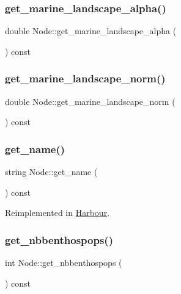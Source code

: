 \subsubsection{\texorpdfstring{get\_marine\_landscape\_alpha()}{get\_marine\_landscape\_alpha()}}
{\footnotesize\ttfamily double Node\+::get\+\_\+marine\+\_\+landscape\+\_\+alpha (\begin{DoxyParamCaption}{ }\end{DoxyParamCaption}) const}

\mbox{\label{class_node_a0011af7b829153b4e449067662b7e606}} 
\subsubsection{\texorpdfstring{get\_marine\_landscape\_norm()}{get\_marine\_landscape\_norm()}}
{\footnotesize\ttfamily double Node\+::get\+\_\+marine\+\_\+landscape\+\_\+norm (\begin{DoxyParamCaption}{ }\end{DoxyParamCaption}) const}

\mbox{\label{class_node_afd4050178cc0d4eb0ff137466dcafdd8}} 
\subsubsection{\texorpdfstring{get\_name()}{get\_name()}}
{\footnotesize\ttfamily string Node\+::get\+\_\+name (\begin{DoxyParamCaption}{ }\end{DoxyParamCaption}) const\hspace{0.3cm}{\ttfamily [virtual]}}



Reimplemented in \mbox{\hyperlink{class_harbour_a515714090da250f1a433185e8a57ce83}{Harbour}}.

\mbox{\label{class_node_a74c590ed71d8d3ca60abbccddebf0d83}} 
\subsubsection{\texorpdfstring{get\_nbbenthospops()}{get\_nbbenthospops()}}
{\footnotesize\ttfamily int Node\+::get\+\_\+nbbenthospops (\begin{DoxyParamCaption}{ }\end{DoxyParamCaption}) const\hspace{0.3cm}{\ttfamily [inline]}}

